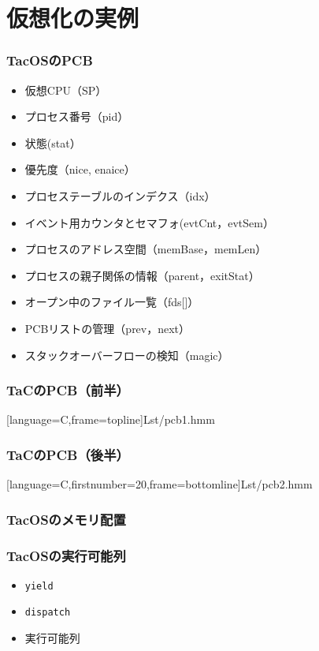 \documentclass[dvipdfmx]{beamer}
\begin{document}
\section{仮想化の実例}
\begin{frame}
  \frametitle{TacOSのPCB}
  \begin{itemize}
    \item 仮想CPU（SP）
    \item プロセス番号（pid）
    \item 状態(stat）
    \item 優先度（nice, enaice）
    \item プロセステーブルのインデクス（idx）
    \item イベント用カウンタとセマフォ(evtCnt，evtSem）
    \item プロセスのアドレス空間（memBase，memLen）
    \item プロセスの親子関係の情報（parent，exitStat）
    \item オープン中のファイル一覧（fds[]）
    \item PCBリストの管理（prev，next）
    \item スタックオーバーフローの検知（magic）
  \end{itemize}
\end{frame}

\begin{frame}[fragile]
  \frametitle{TaCのPCB（前半）}
  
      [language={C},frame=topline]{Lst/pcb1.hmm}
\end{frame}

\begin{frame}[fragile]
  \frametitle{TaCのPCB（後半）}
  
      [language={C},firstnumber=20,frame=bottomline]{Lst/pcb2.hmm}
\end{frame}

\begin{frame}
  \frametitle{TacOSのメモリ配置}
\end{frame}

\begin{frame}
  \frametitle{TacOSの実行可能列}
  \begin{itemize}
    \item {\tt yield}
    \item {\tt dispatch}
    \item 実行可能列
  \end{itemize}
\end{frame}
\end{document}
